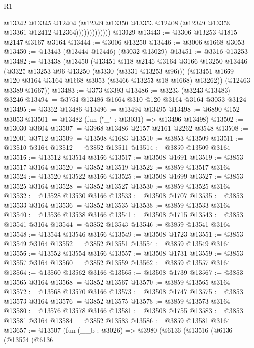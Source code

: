 \begin{lexlean}{R1}
\begin{coremodule}
                          @13342
                          @13345
                          @12404
                          (@12349
                            @13350
                            @13353
                            @12408
                            (@12349 @13358 @13361 @12412 @12364)))))))))))))
    @13029
@13443 := @3306 @13253 @1815 @2147 @3167 @3164
@13444 := @3006 @13250
@13446 := @3006 @1668 @3053
@13450 := @13443 (@13444 @13446) (@3032 @13029)
@13451 := @3316 @13253
@13482 := @13438
    (@13450
      (@13451
        @118
        @2146
        @3164
        @3166
        @13250
        @13446
        (@3325 @13253 @96 @13250 (@3330 (@3331 @13253 @96)))
        (@13451 @1669 @120 @3164 @3164 @1668 @3053 (@3466 @13253 @18 @1668) @13262))
      (@12463 @3389 @1667))
@13483 := @373 @3393
@13486 := @3233 (@3243 @13483) @3246
@13494 := @3754 @13486 @1664 @310 @120 @3164 @3164 @3053 @3124
@13495 := @3362 @13486
@13496 := @13494 @13495
@13498 := @6890 @152 @3053
@13501 := @13482 (fun ("_" : @13031) => @13496 @13498)
@13502 := @13030 @3604
@13507 := @3968 @13486 @2157 @2161 @2262 @3548
@13508 := @12001 @3712
@13509 := @13508 @1683
@13510 := @3853 @13509
@13511 := @13510 @3164
@13512 := @3852 @13511
@13514 := @3859 @13509 @3164
@13516 := @13512 @13514 @3166
@13517 := @13508 @1691
@13519 := @3853 @13517 @3164
@13520 := @3852 @13519
@13522 := @3859 @13517 @3164
@13524 := @13520 @13522 @3166
@13525 := @13508 @1699
@13527 := @3853 @13525 @3164
@13528 := @3852 @13527
@13530 := @3859 @13525 @3164
@13532 := @13528 @13530 @3166
@13533 := @13508 @1707
@13535 := @3853 @13533 @3164
@13536 := @3852 @13535
@13538 := @3859 @13533 @3164
@13540 := @13536 @13538 @3166
@13541 := @13508 @1715
@13543 := @3853 @13541 @3164
@13544 := @3852 @13543
@13546 := @3859 @13541 @3164
@13548 := @13544 @13546 @3166
@13549 := @13508 @1723
@13551 := @3853 @13549 @3164
@13552 := @3852 @13551
@13554 := @3859 @13549 @3164
@13556 := @13552 @13554 @3166
@13557 := @13508 @1731
@13559 := @3853 @13557 @3164
@13560 := @3852 @13559
@13562 := @3859 @13557 @3164
@13564 := @13560 @13562 @3166
@13565 := @13508 @1739
@13567 := @3853 @13565 @3164
@13568 := @3852 @13567
@13570 := @3859 @13565 @3164
@13572 := @13568 @13570 @3166
@13573 := @13508 @1747
@13575 := @3853 @13573 @3164
@13576 := @3852 @13575
@13578 := @3859 @13573 @3164
@13580 := @13576 @13578 @3166
@13581 := @13508 @1755
@13583 := @3853 @13581 @3164
@13584 := @3852 @13583
@13586 := @3859 @13581 @3164
@13657 := @13507
    (fun (__b : @3026) =>
    @3980
      (@6136
        (@13516
          (@6136
            (@13524
              (@6136

\end{coremodule}
\end{lexlean}
